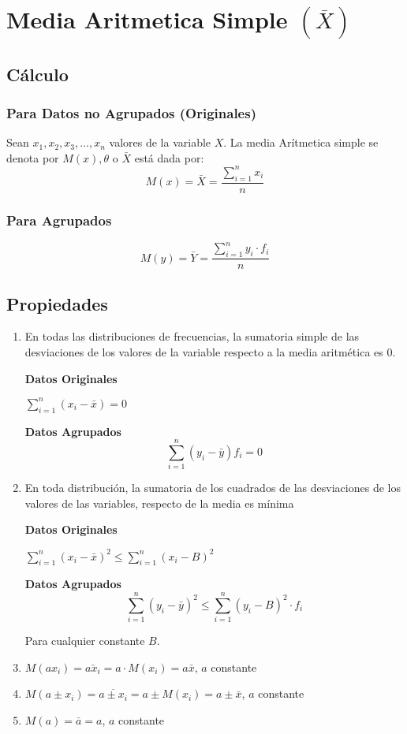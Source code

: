 \section{Media Aritmetica Simple $(\overline{X})$} 
\subsection{Cálculo}
\subsubsection{Para Datos no Agrupados (Originales)}
Sean $x_1,x_2,x_3,\ldots ,x_n$ valores de la variable $X$. La media Arítmetica simple se denota por $M(x),\theta$ o $\bar{X}$ está dada por:
$$M(x)=\bar{X}=\dfrac{\displaystyle\sum_{i=1}^{n}x_i}{n}$$
\subsubsection{Para Agrupados}
$$M(y)=\bar{Y}=\dfrac{\displaystyle\sum_{i=1}^{n}y_i\cdot f_i}{n}$$
\subsection{Propiedades}
\begin{enumerate}
\item En todas las distribuciones de frecuencias, la sumatoria simple de las desviaciones de los valores de la variable respecto a la media aritmética es 0.
\begin{multicols}{2}
\textbf{Datos Originales} 
\begin{center}
$\displaystyle\sum_{i=1}^{n}(x_i-\bar{x})=0$
\end{center}
\columnbreak
\textbf{Datos Agrupados}
$$\displaystyle\sum_{i=1}^{n}(y_i-\bar{y})f_i=0$$
\end{multicols}
\item En toda distribución, la sumatoria de los cuadrados de las desviaciones de los valores de las variables, respecto de la media es mínima
\begin{multicols}{2}
\textbf{Datos Originales}
\begin{center}
$\displaystyle\sum_{i=1}^{n}(x_i-\bar{x})^2 \leq \displaystyle\sum_{i=1}^{n}(x_i-B)^2 $
\end{center}
\columnbreak
\textbf{Datos Agrupados}
$$\displaystyle\sum_{i=1}^{n}(y_i-\bar{y})^2 \leq \displaystyle\sum_{i=1}^{n}(y_i-B)^2\cdot f_i $$ 
\end{multicols}
Para cualquier constante $B$.
\item $M(a x_i)=\bar{ax_i} = a\cdot M(x_i) = a\bar{x}$, $a$ constante
\item $M(a \pm x_i)=\overline{{a \pm x_i}} = a\pm M(x_i) = a\pm\bar{x}$, $a$ constante
\item $M(a)=\bar{a}=a$, $a$ constante
\end{enumerate}

